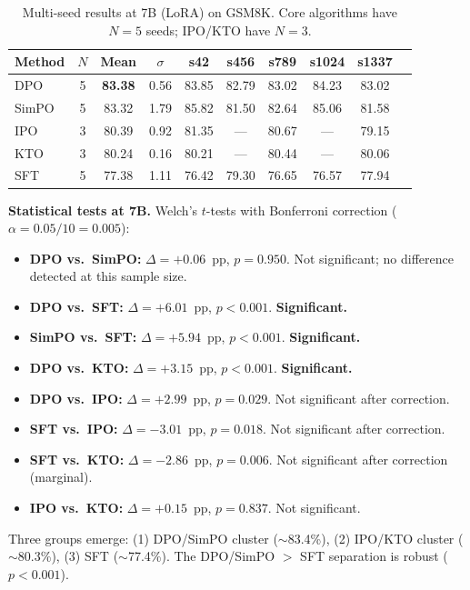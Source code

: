 \documentclass{article}
\begin{document}
\begin{table}[ht]
\centering
\caption{Multi-seed results at 7B (LoRA) on GSM8K. Core algorithms have $N{=}5$ seeds; IPO/KTO have $N{=}3$.}
\label{tab:seedfix_7b}
\small
\begin{tabular}{@{}lccccccccc@{}}
\toprule
\textbf{Method} & \textbf{$N$} & \textbf{Mean} & \textbf{$\sigma$} & \textbf{s42} & \textbf{s456} & \textbf{s789} & \textbf{s1024} & \textbf{s1337} \\
\midrule
DPO & 5 & \textbf{83.38} & 0.56 & 83.85 & 82.79 & 83.02 & 84.23 & 83.02 \\
SimPO & 5 & 83.32 & 1.79 & 85.82 & 81.50 & 82.64 & 85.06 & 81.58 \\
IPO & 3 & 80.39 & 0.92 & 81.35 & --- & 80.67 & --- & 79.15 \\
KTO & 3 & 80.24 & 0.16 & 80.21 & --- & 80.44 & --- & 80.06 \\
SFT & 5 & 77.38 & 1.11 & 76.42 & 79.30 & 76.65 & 76.57 & 77.94 \\
\bottomrule
\end{tabular}
\end{table}

\textbf{Statistical tests at 7B.}
Welch's $t$-tests with Bonferroni correction ($\alpha = 0.05 / 10 = 0.005$):
\begin{itemize}[leftmargin=*,itemsep=1pt]
    \item \textbf{DPO vs.\ SimPO:} $\Delta = +0.06$~pp, $p = 0.950$. Not significant; no difference detected at this sample size.
    \item \textbf{DPO vs.\ SFT:} $\Delta = +6.01$~pp, $p < 0.001$. \textbf{Significant.}
    \item \textbf{SimPO vs.\ SFT:} $\Delta = +5.94$~pp, $p < 0.001$. \textbf{Significant.}
    \item \textbf{DPO vs.\ KTO:} $\Delta = +3.15$~pp, $p < 0.001$. \textbf{Significant.}
    \item \textbf{DPO vs.\ IPO:} $\Delta = +2.99$~pp, $p = 0.029$. Not significant after correction.
    \item \textbf{SFT vs.\ IPO:} $\Delta = -3.01$~pp, $p = 0.018$. Not significant after correction.
    \item \textbf{SFT vs.\ KTO:} $\Delta = -2.86$~pp, $p = 0.006$. Not significant after correction (marginal).
    \item \textbf{IPO vs.\ KTO:} $\Delta = +0.15$~pp, $p = 0.837$. Not significant.
\end{itemize}

Three groups emerge: (1) DPO/SimPO cluster (${\sim}$83.4\%), (2) IPO/KTO cluster (${\sim}$80.3\%), (3) SFT (${\sim}$77.4\%). The DPO/SimPO $>$ SFT separation is robust ($p < 0.001$).
\end{document}
